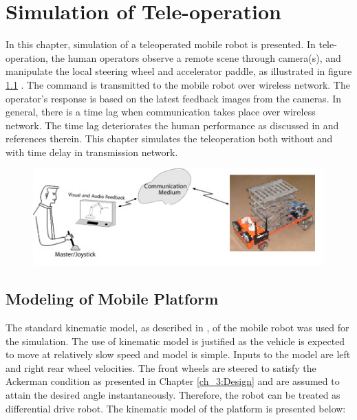 
\chapter{Simulation of Tele-operation}
\label{c6_simulation}
In this chapter, simulation of a teleoperated mobile robot is presented. In tele-operation, the human operators observe a remote scene through camera(s), and manipulate the local steering wheel and accelerator paddle, as illustrated in figure \ref{fig:teleoperation} . The command is transmitted to the mobile robot over wireless network. The operator's response is based on the latest feedback images from the cameras. In general, there is a time lag when communication takes place over wireless network. The time lag deteriorates the human performance as discussed in \cite{chen2007human} and references therein.  This chapter simulates the teleoperation both without and with time delay in transmission network.
\begin{figure}
	\includegraphics[width=\linewidth,keepaspectratio]{Chapter6/fig/teleoperation}
	\label{fig:teleoperation} 
\end{figure}

\section{Modeling of Mobile Platform}
The standard kinematic model, as described in \cite{campion1996structural}, of the mobile robot was used for the simulation. The use of kinematic model is justified as  the vehicle is expected to move at relatively slow speed and model is simple. Inputs to the model are left and right rear wheel velocities. The front wheels are steered to satisfy the Ackerman condition as presented in Chapter \ref{ch_3:Design}  and are assumed to attain the desired angle instantaneously. Therefore, the robot can be treated as differential drive robot.  The kinematic model of the platform is presented below:


